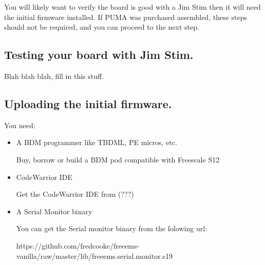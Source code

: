 \documentclass[12pt,a4paper,titlepage]{article}
\begin{document}
You will likely want to verify the board is good with a Jim Stim  then it will need the initial firmware installed. If PUMA was purchased assembled, these steps should not be required, and you can proceed to the next step.

\subsection{Testing your board with Jim Stim.}

Blah blah blah, fill in this stuff.

\subsection{Uploading the initial firmware.}

You need:
\begin{itemize}
\item A BDM programmer like TBDML, PE micros, etc.

Buy, borrow or build a BDM pod compatible with Freescale S12

\item CodeWarrior IDE

Get the CodeWarrior IDE from (???)

\item A Serial Monitor binary

You can get the Serial monitor binary from the folowing url:
\newline

https://github.com/fredcooke/freeems-vanilla/raw/master/lib/freeems.serial.monitor.s19
\newline


\end{itemize}
\end{document}
